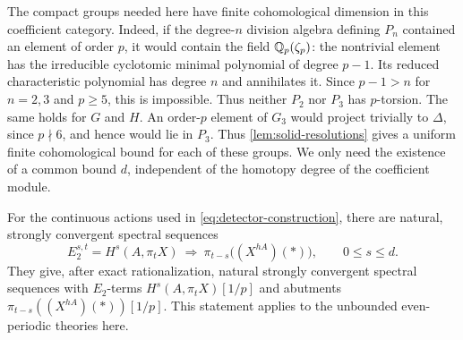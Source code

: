 The compact groups needed here have finite cohomological dimension in
this coefficient category.  Indeed, if the degree-$n$ division algebra
defining $P_n$ contained an element of order $p$, it would contain the
field $\mathbb Q_p(\zeta_p)$: the nontrivial element has the irreducible
cyclotomic minimal polynomial of degree $p-1$.  Its reduced
characteristic polynomial has degree $n$ and annihilates it.
Since $p-1>n$ for $n=2,3$ and $p\geq5$, this is impossible.
Thus neither $P_2$ nor $P_3$ has $p$-torsion.  The same holds for
$G$ and $H$.  An order-$p$ element of $G_3$ would project trivially to
$\Delta$, since $p\nmid6$, and hence would lie in $P_3$.  Thus
\cref{lem:solid-resolutions} gives a uniform finite cohomological bound
for each of these groups.  We only need the existence of a common bound
$d$, independent of the homotopy degree of the coefficient module.

\begin{lemma}\label{lem:descent-convergence}
For the continuous actions used in \eqref{eq:detector-construction},
there are natural, strongly convergent spectral sequences
\begin{equation}\label{eq:integral-descent-ss}
 E_2^{s,t}=H^s(A,\pi_tX)
       \ \Longrightarrow\ \pi_{t-s}\bigl((X^{hA})(*)\bigr),
 \qquad 0\leq s\leq d.
\end{equation}
They give, after exact rationalization, natural strongly convergent
spectral sequences with $E_2$-terms $H^s(A,\pi_tX)[1/p]$ and abutments
$\pi_{t-s}((X^{hA})(*))[1/p]$.
This statement applies to the unbounded even-periodic theories here.
\end{lemma}

